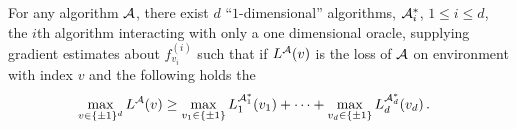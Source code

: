 
\begin{lemma}
\label{lemma:sep}
For any algorithm $\mathcal{A}$, there exist  $d$ ``$1$-dimensional'' algorithms, $\mathcal{A}_i^*$, $1\le i \le d$,
the $i$th algorithm interacting with only a one dimensional oracle, supplying gradient estimates about $f_{v_i}^{(i)}$ 
such that if $L^{\mathcal{A}}(v)$ is the loss of $\mathcal{A}$ on environment with index $v$ and the following holds
the 
\begin{align}
\label{eq:onedimlb}
&\max_{v\in \{\pm 1\}^d} L^{\mathcal{A}}(v) 
\ge   \max_{v_1\in \{\pm 1\}} L_1^{\mathcal{A}_1^*}(v_1) + \dots + \max_{v_d\in \{\pm 1 \}} L_d^{\mathcal{A}^*_d}(v_d)\,.
\end{align}
\end{lemma}
